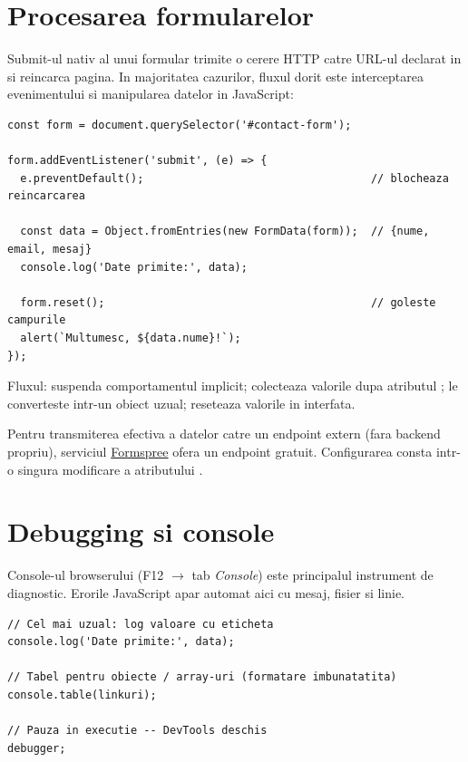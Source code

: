 \section{Procesarea formularelor}

Submit-ul nativ al unui formular trimite o cerere HTTP catre URL-ul declarat in  si reincarca pagina. In majoritatea cazurilor, fluxul dorit este interceptarea evenimentului si manipularea datelor in JavaScript:

\begin{lstlisting}[style=js, caption={Captura datelor de formular fara reincarcarea paginii}]
const form = document.querySelector('#contact-form');

form.addEventListener('submit', (e) => {
  e.preventDefault();                                   // blocheaza reincarcarea

  const data = Object.fromEntries(new FormData(form));  // {nume, email, mesaj}
  console.log('Date primite:', data);

  form.reset();                                         // goleste campurile
  alert(`Multumesc, ${data.nume}!`);
});
\end{lstlisting}

Fluxul:  suspenda comportamentul implicit;  colecteaza valorile dupa atributul ;  le converteste intr-un obiect uzual;  reseteaza valorile in interfata.

\begin{ponturi}
Pentru transmiterea efectiva a datelor catre un endpoint extern (fara backend propriu), serviciul \href{https://formspree.io}{Formspree} ofera un endpoint gratuit. Configurarea consta intr-o singura modificare a atributului .
\end{ponturi}

\section{Debugging si console}

Console-ul browserului (F12 $\to$ tab \emph{Console}) este principalul instrument de diagnostic. Erorile JavaScript apar automat aici cu mesaj, fisier si linie.

\begin{lstlisting}[style=js, caption={Trei moduri de a inspecta valorile}]
// Cel mai uzual: log valoare cu eticheta
console.log('Date primite:', data);

// Tabel pentru obiecte / array-uri (formatare imbunatatita)
console.table(linkuri);

// Pauza in executie -- DevTools deschis
debugger;
\end{lstlisting}

